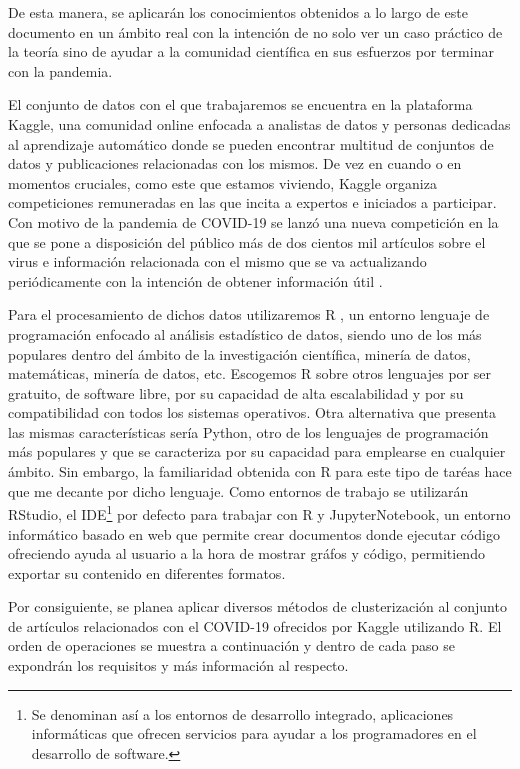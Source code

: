 \documentclass[10pt, a4paper]{article}
\begin{document}
De esta manera, se aplicarán los conocimientos obtenidos a lo largo de este documento en un ámbito real con la intención de no solo ver un caso práctico de la teoría sino de ayudar a la comunidad científica en sus esfuerzos por terminar con la pandemia.

El conjunto de datos con el que trabajaremos se encuentra en la plataforma Kaggle, una comunidad online enfocada a analistas de datos y personas dedicadas al aprendizaje automático donde se pueden encontrar multitud de conjuntos de datos y publicaciones relacionadas con los mismos. De vez en cuando o en momentos cruciales, como este que estamos viviendo, Kaggle organiza competiciones remuneradas en las que incita a expertos e iniciados a participar. Con motivo de la pandemia de COVID-19 se lanzó una nueva competición en la que se pone a disposición del público más de dos cientos mil artículos sobre el virus e información relacionada con el mismo que se va actualizando periódicamente con la intención de obtener información útil \cite{kaggle}.

Para el procesamiento de dichos datos utilizaremos R \cite{R}, un entorno lenguaje de programación enfocado al análisis estadístico de datos, siendo uno de los más populares dentro del ámbito de la investigación científica, minería de datos, matemáticas, minería de datos, etc. Escogemos R sobre otros lenguajes por ser gratuito, de software libre, por su capacidad de alta escalabilidad y por su compatibilidad con todos los sistemas operativos. Otra alternativa que presenta las mismas características sería Python, otro de los lenguajes de programación más populares y que se caracteriza por su capacidad para emplearse en cualquier ámbito. Sin embargo, la familiaridad obtenida con R para este tipo de taréas hace que me decante por dicho lenguaje. Como entornos de trabajo se utilizarán RStudio, el IDE\footnote{Se denominan así a los entornos de desarrollo integrado, aplicaciones informáticas que ofrecen servicios para ayudar a los programadores en el desarrollo de software.} por defecto para trabajar con R y JupyterNotebook, un entorno informático basado en web que permite crear documentos donde ejecutar código ofreciendo ayuda al usuario a la hora de mostrar gráfos y código, permitiendo exportar su contenido en diferentes formatos.

Por consiguiente, se planea aplicar diversos métodos de clusterización al conjunto de artículos relacionados con el COVID-19 ofrecidos por Kaggle utilizando R. El orden de operaciones se muestra a continuación y dentro de cada paso se expondrán los requisitos y más información al respecto.
\end{document}
